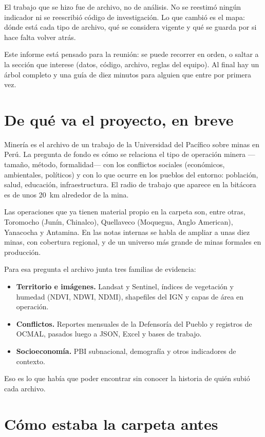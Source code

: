 \documentclass[11pt,a4paper]{article}
\begin{document}
El trabajo que se hizo fue de archivo, no de análisis. No se reestimó ningún indicador ni se reescribió código de investigación. Lo que cambió es el mapa: dónde está cada tipo de archivo, qué se considera vigente y qué se guarda por si hace falta volver atrás.

Este informe está pensado para la reunión: se puede recorrer en orden, o saltar a la sección que interese (datos, código, archivo, reglas del equipo). Al final hay un árbol completo y una guía de diez minutos para alguien que entre por primera vez.

\section{De qué va el proyecto, en breve}

Minería es el archivo de un trabajo de la Universidad del Pacífico sobre minas en Perú. La pregunta de fondo es cómo se relaciona el tipo de operación minera ---tamaño, método, formalidad--- con los conflictos sociales (económicos, ambientales, políticos) y con lo que ocurre en los pueblos del entorno: población, salud, educación, infraestructura. El radio de trabajo que aparece en la bitácora es de unos 20~km alrededor de la mina.

Las operaciones que ya tienen material propio en la carpeta son, entre otras, Toromocho (Junín, Chinalco), Quellaveco (Moquegua, Anglo American), Yanacocha y Antamina. En las notas internas se habla de ampliar a unas diez minas, con cobertura regional, y de un universo más grande de minas formales en producción.

Para esa pregunta el archivo junta tres familias de evidencia:

\begin{itemize}
  \item \textbf{Territorio e imágenes.} Landsat y Sentinel, índices de vegetación y humedad (NDVI, NDWI, NDMI), shapefiles del IGN y capas de área en operación.
  \item \textbf{Conflictos.} Reportes mensuales de la Defensoría del Pueblo y registros de OCMAL, pasados luego a JSON, Excel y bases de trabajo.
  \item \textbf{Socioeconomía.} PBI subnacional, demografía y otros indicadores de contexto.
\end{itemize}

Eso es lo que había que poder encontrar sin conocer la historia de quién subió cada archivo.

\section{Cómo estaba la carpeta antes}
\end{document}
